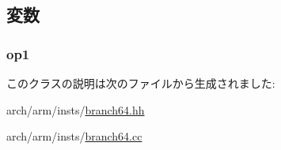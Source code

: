 \subsection{変数}
\hypertarget{classArmISA_1_1BranchReg64_a4c465c43ad568f8bcf8ae71480e9cfea}{
\subsubsection[{op1}]{ {\bf op1}}}
\label{classArmISA_1_1BranchReg64_a4c465c43ad568f8bcf8ae71480e9cfea}


このクラスの説明は次のファイルから生成されました:\begin{DoxyCompactItemize}
\item 
arch/arm/insts/\hyperlink{branch64_8hh}{branch64.hh}\item 
arch/arm/insts/\hyperlink{branch64_8cc}{branch64.cc}\end{DoxyCompactItemize}
